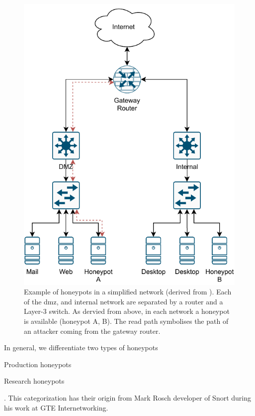 \begin{figure}[h]
    \centering
    \includegraphics{figures/honeypot-example.pdf}
    \caption[Example of honeypots in a simplified network (derived from \cite{Spitzner2003})]{Example of honeypots in a simplified network (derived from \cite{Spitzner2003}). Each of the \ac{dmz}, and internal network are separated by a router and a Layer-3 switch. As dervied from above, in each network a honeypot is available (honeypot A, B). The read path symbolises the path of an attacker coming from the gateway router.}
    \label{fig:honeypot-example}
\end{figure}

In general, we differentiate two types of honeypots
\begin{enumerate*}[label=(\roman*)]
    \item Production honeypots
    \item Research honeypots
\end{enumerate*}.
This categorization has their origin from Mark Rosch developer of Snort during his work at GTE Internetworking.

